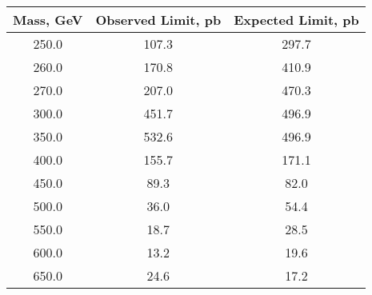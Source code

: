 \begin{table}
\begin{center}
\vspace{1 cm} \ \\
\begin{tabular}{|c|c|c|}
\hline
Mass, GeV &  Observed Limit, pb &  Expected Limit, pb \\
\hline
     250.0 &               107.3 &               297.7 \\
     260.0 &               170.8 &               410.9 \\
     270.0 &               207.0 &               470.3 \\
     300.0 &               451.7 &               496.9 \\
     350.0 &               532.6 &               496.9 \\
     400.0 &               155.7 &               171.1 \\
     450.0 &                89.3 &                82.0 \\
     500.0 &                36.0 &                54.4 \\
     550.0 &                18.7 &                28.5 \\
     600.0 &                13.2 &                19.6 \\
     650.0 &                24.6 &                17.2 \\

\end{tabular}
\end{center}
\end{table}

